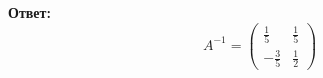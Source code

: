 \documentclass[a4paper,12pt]{article} %
\begin{document}
\textbf{Ответ:}
\begin{equation*}
    A^{-1} = \left(
\begin{array}{cc}
\frac{1}{5} & \frac{1}{5}\\
- \frac{3}{5} & \frac{1}{2}
\end{array}
\right)
\end{equation*}
\end{document}
